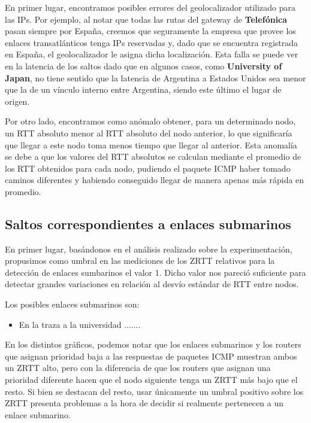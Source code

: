 \documentclass[10pt, a4paper]{article}
\begin{document}
En primer lugar, encontramos posibles errores del geolocalizador utilizado para las IPs. Por ejemplo, al notar que todas las rutas del gateway de \textbf{Telefónica} pasan siempre por España, creemos que seguramente la empresa que provee los enlaces transatlánticos tenga IPs reservadas y, dado que se encuentra registrada en España, el geolocalizador le asigna dicha localización. Esta falla se puede ver en la latencia de los saltos dado que en algunos casos, como \textbf{University of Japan}, no tiene sentido que la latencia de Argentina a Estados Unidos sea menor que la de un vínculo interno entre Argentina, siendo este último el lugar de origen.

Por otro lado, encontramos como anómalo obtener, para un determinado nodo, un RTT absoluto menor al RTT absoluto del nodo anterior, lo que significaría que llegar a este nodo toma menos tiempo que llegar al anterior. Esta anomalía se debe a que los valores del RTT absolutos se calculan mediante el promedio de los RTT obtenidos para cada nodo, pudiendo el paquete ICMP haber tomado caminos diferentes y habiendo conseguido llegar de manera apenas más rápida en promedio.

\subsection{Saltos correspondientes a enlaces submarinos}

En primer lugar, basándonos en el análisis realizado sobre la experimentación, propusimos como umbral en las mediciones de los ZRTT relativos para la detección de enlaces sumbarinos el valor 1. Dicho valor nos pareció suficiente para detectar grandes variaciones en relación al desvío estándar de RTT entre nodos.

Los posibles enlaces submarinos son:
\begin{itemize}
\item En la traza a la universidad .......
\end{itemize}

En los distintos gráficos, podemos notar que los enlaces submarinos y los routers que asignan prioridad baja a las respuestas de paquetes ICMP muestran ambos un ZRTT alto, pero con la diferencia de que los routers que asignan una prioridad diferente hacen que el nodo siguiente tenga un ZRTT más bajo que el resto. Si bien se destacan del resto, usar únicamente un umbral positivo sobre los ZRTT presenta problemas a la hora de decidir si realmente pertenecen a un enlace submarino.
\end{document}
